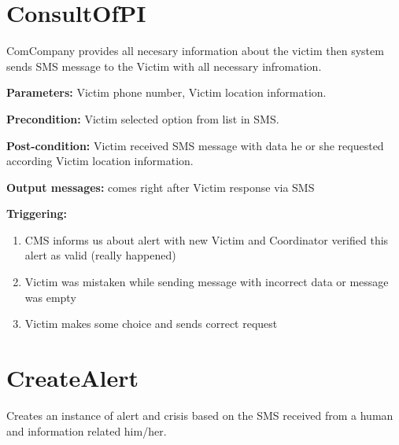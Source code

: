 \section{ConsultOfPI}
\label{operation:ConsultOfPI}
ComCompany provides all necesary information about the victim then system sends
SMS message to the Victim with all necessary infromation. 
\begin{description}

\item \textbf{Parameters:} Victim phone number, Victim location information.
\item \textbf{Precondition:} Victim selected option from list in SMS.
\item \textbf{Post-condition:} Victim received SMS message with data he or she
requested according Victim location information.
\item \textbf{Output messages:} comes right after Victim response via SMS

\item \textbf{Triggering:}
\begin{enumerate}
\item CMS informs us about alert with new Victim and Coordinator verified this
alert as valid (really happened)
\item Victim was mistaken while sending message with incorrect data or message was empty
\item Victim makes some choice and sends correct request
\end{enumerate}
 
\end{description}

\section{CreateAlert}
\label{operation:CreateAlert}
Creates an instance of alert and crisis based on the SMS received from a human
and information related him/her.

